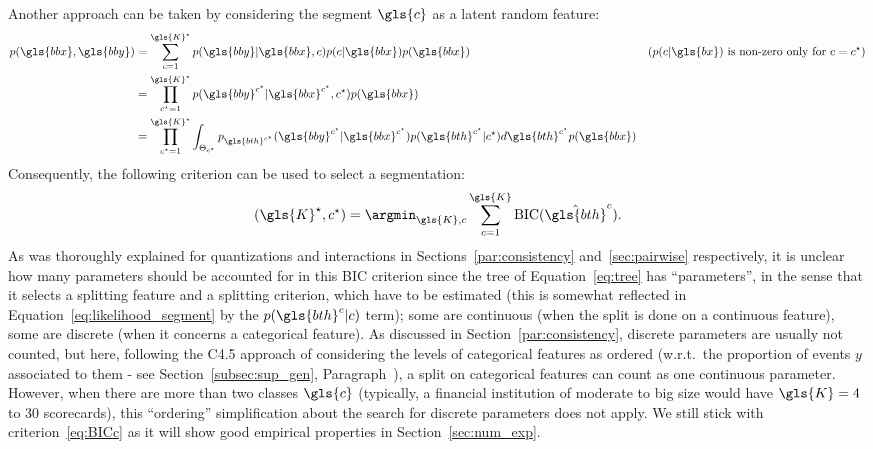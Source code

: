 Another approach can be taken by considering the segment $\gls{c}$ as a latent random feature:
\begin{align}
p(\gls{bbx},\gls{bby}) & =  \sum_{c=1}^{\gls{K}^\star} p(\gls{bby} | \gls{bbx}, c) p(c | \gls{bbx}) p(\gls{bbx}) & \text{($p(c | \gls{bx})$ is non-zero only for $c = c^\star$)} \nonumber \\
 & = \prod_{c^\star=1}^{\gls{K}^\star} p(\gls{bby}^{c^\star} | \gls{bbx}^{c^\star}, c^\star) p(\gls{bbx}) \nonumber \\
 & = \prod_{c^\star=1}^{\gls{K}^\star} \int_{\Theta_{c^\star}} p_{\gls{bth}^{c^\star}}(\gls{bby}^{c^\star} | \gls{bbx}^{c^\star}) p(\gls{bth}^{c^\star} | c^\star) d\gls{bth}^{c^\star} p(\gls{bbx}) \label{eq:likelihood_segment}
\end{align}
Consequently, the following criterion can be used to select a segmentation:
\begin{equation} \label{eq:BICc}
(\gls{K}^\star, c^\star) = \argmin_{\gls{K},c} \sum_{c=1}^{\gls{K}} \text{BIC}(\hat{\gls{bth}}^c).
\end{equation}
As was thoroughly explained for quantizations and interactions in Sections~\ref{par:consistency} and~\ref{sec:pairwise} respectively, it is unclear how many parameters should be accounted for in this BIC criterion since the tree of Equation~\eqref{eq:tree} has ``parameters'', in the sense that it selects a splitting feature and a splitting criterion, 
which have to be estimated (this is somewhat reflected in Equation~\eqref{eq:likelihood_segment} by the $p(\gls{bth}^c | c)$ term); some are continuous (when the split is done on a continuous feature), some are discrete (when it concerns a categorical feature). As discussed in Section~\ref{par:consistency}, discrete parameters are usually not counted, but here, following the C4.5 approach of considering the levels of categorical features as ordered (w.r.t.\ the proportion of events $y$ associated to them - see Section~\ref{subsec:sup_gen}, Paragraph~), a split on categorical features can count as one continuous parameter.
However, when there are more than two classes $\gls{c}$ (typically, a financial institution of moderate to big size would have $\gls{K} = 4$ to $30$ scorecards), this ``ordering'' simplification about the search for discrete parameters does not apply. We still stick with criterion~\eqref{eq:BICc} as it will show good empirical properties in Section~\ref{sec:num_exp}.


